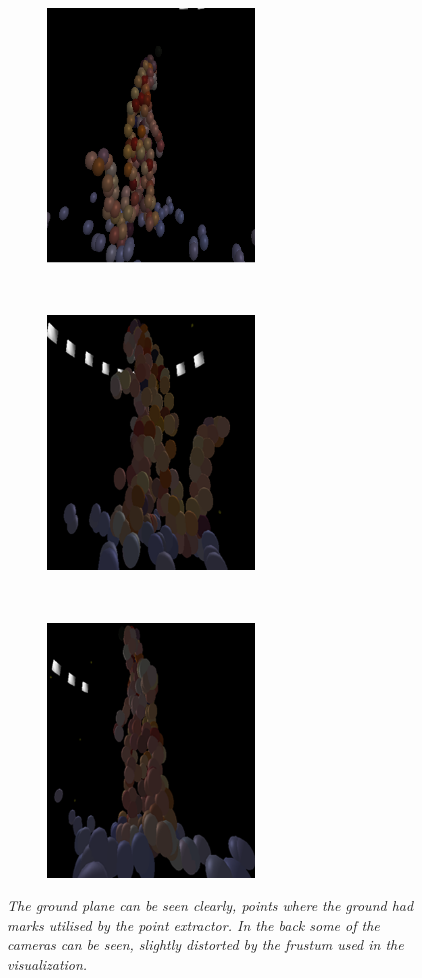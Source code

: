 \begin{figure}[htb]
	\centering
	\begin{subfigure}[b]{0.3\textwidth}
		\includegraphics[width=55mm]{images/dinosaur_alx_BACKSIDE.png}
	\end{subfigure}
	~ ~ ~
	\begin{subfigure}[b]{0.3\textwidth}
		\includegraphics[width=55mm]{images/dinosaur_alx_LEFTSIDE.png}
	\end{subfigure}
	~ ~ ~
	\begin{subfigure}[b]{0.3\textwidth}
		\includegraphics[width=55mm]{images/dinosaur_alx_FRONT.png}
	\end{subfigure}
		\caption{\textit{The ground plane can be seen clearly, points where the ground had marks utilised by the point extractor. In the back some of the cameras can be seen, slightly distorted by the frustum used in the visualization.}}
	\label{fig:CANHASDUALIMAGE}  %
\end{figure}

